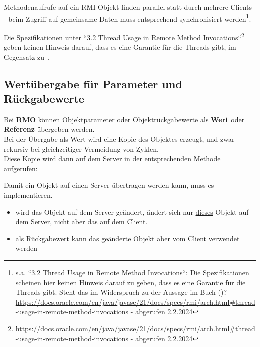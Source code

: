 \begin{tcolorbox}[enlarge top by=0.5cm,enlarge bottom by=0.5cm]
    Methodenaufrufe auf ein RMI-Objekt finden parallel statt durch mehrere Clients - beim Zugriff auf gemeinsame Daten muss entsprechend synchronisiert werden\footnote{
        s.a. ``3.2 Thread Usage in Remote Method Invocations``: Die Spezifikationen scheinen hier keinen Hinweis darauf zu geben, dass es eine Garantie für die Threads gibt. Steht das im Widerspruch zu der Aussage im Buch (\cite[330]{Oec22})? \url{https://docs.oracle.com/en/java/javase/21/docs/specs/rmi/arch.html#thread-usage-in-remote-method-invocations} - abgerufen 2.2.2024
    }.
\end{tcolorbox}

\begin{tcolorbox}[colback=red!20,color=white,title=Anmerkung]
    Die Spezifikationen unter ``3.2 Thread Usage in Remote Method Invocations``\footnote{
        \url{https://docs.oracle.com/en/java/javase/21/docs/specs/rmi/arch.html#thread-usage-in-remote-method-invocations} - abgerufen 2.2.2024
    } geben keinen Hinweis darauf, dass es eine Garantie für die Threads gibt, im Gegensatz zu~\cite[330]{Oec22}.
\end{tcolorbox}

\subsection{Wertübergabe für Parameter und Rückgabewerte}\label{sec:valuermi}

Bei \textbf{RMO} können Objektparameter oder Objektrückgabewerte als \textbf{Wert} oder \textbf{Referenz} übergeben werden.\\

\noindent
Bei der Übergabe als Wert wird eine Kopie des Objektes erzeugt, und zwar rekursiv bei gleichzeitiger Vermeidung von Zyklen.\\

\noindent
Diese Kopie wird dann auf dem Server in der entsprechenden Methode aufgerufen:

\begin{tcolorbox}[enlarge top by=0.5cm,enlarge bottom by=0.5cm]
    Damit ein Objekt auf einen Server übertragen werden kann, muss es  implementieren.
\end{tcolorbox}

\begin{itemize}
    \item wird das Objekt auf dem Server geändert, ändert sich nur \ul{dieses} Objekt auf dem Server, nicht aber das auf dem Client.
    \item \ul{als Rückgabewert} kann das geänderte Objekt aber vom Client verwendet werden
\end{itemize}

